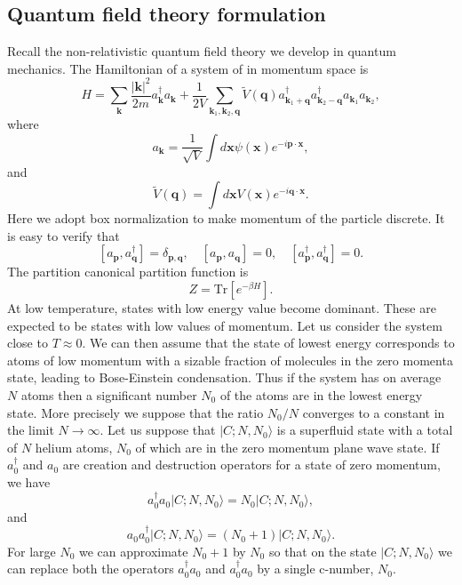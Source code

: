 \subsection{Quantum field theory formulation}
Recall the non-relativistic quantum field theory we develop in quantum mechanics.
The Hamiltonian of a system of  in momentum space is
\[H = \sum_{\bm{k}} \frac{|\bm{k}|^2}{2m} a_{\bm{k}}^{\dagger} a_{\bm{k}} + \frac{1}{2V} \sum_{\bm{k}_1,\bm{k}_2,\bm{q}} \tilde{V}(\bm{q}) a^{\dagger}_{\bm{k}_1 + \bm{q}} a^{\dagger}_{\bm{k}_2-\bm{q}} a_{\bm{k}_1} a_{\bm{k}_2},\]
where
\[a_{\bm{k}} = \frac{1}{\sqrt{V}} \int d\bm{x}\psi(\bm{x}) e^{-i\bm{p}\cdot\bm{x}},\]
and
\[\tilde{V}(\bm{q}) = \int d\bm{x} V(\bm{x}) e^{-i\bm{q}\cdot\bm{x}}.\]
Here we adopt box normalization to make momentum of the particle discrete. It is easy to verify that
\[[a_{\bm{p}},a_{\bm{q}}^{\dagger}] = \delta_{\bm{p},\bm{q}} , \quad [a_{\bm{p}},a_{\bm{q}}] = 0 , \quad [a^{\dagger}_{\bm{p}},a^{\dagger}_{\bm{q}}] = 0.\]
The partition canonical partition function is
\[Z = \mathrm{Tr}[e^{-\beta H}].\]
At low temperature, states with low energy value become dominant. These are expected to be states with low values of momentum. 
Let us consider the system close to $T \approx 0$. 
We can then assume that the state of lowest energy corresponds to atoms of low momentum with a sizable fraction of molecules in the zero momenta state, leading to Bose-Einstein condensation. 
Thus if the system has on average $N$ atoms then a significant number $N_0$ of the atoms are in the lowest energy state. More precisely we suppose that the ratio $N_0 / N$ converges to a constant in the limit $N \to \infty$. 
Let us suppose that $|C;N,N_0\rangle$ is a superfluid state with a total of $N$ helium atoms, $N_0$ of which are in the zero momentum plane wave state. 
If $a_0^{\dagger}$ and $a_0$ are creation and destruction operators for a state of zero momentum, we have
\[a_0^{\dagger}a_0 |C;N,N_0\rangle = N_0 |C;N,N_0\rangle,\]
and
\[a_0a_0^{\dagger} |C;N,N_0\rangle = (N_0+1) |C;N,N_0\rangle.\]
For large $N_0$ we can approximate $N_0 + 1$ by $N_0$ so that on the state $|C;N,N_0\rangle$ we can replace both the operators $a_0^{\dagger}a_0$ and $a_0^{\dagger}a_0$ by a single c-number, $N_0$.


